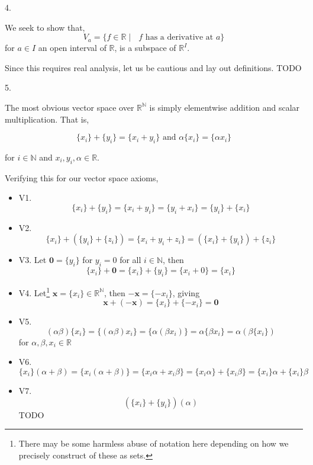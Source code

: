 \documentclass[letterpaper,11pt]{article}
\theoremstyle{definition}
\begin{document}
\pagebreak

\begin{flushleft}
	4.
\end{flushleft}

We seek to show that, $$V_a = \{f \in \mathbb{R} \mid \text{ $f$ has a derivative at $a$}\}$$ for $a \in I$ an open interval of $\mathbb{R}$, is a subspace of $\mathbb{R}^I$. 

\hrulefill

Since this requires real analysis, let us be cautious and lay out definitions. 
TODO

\begin{flushleft}
	5.
\end{flushleft}

The most obvious vector space over $\mathbb{R}^\mathbb{N}$ is simply elementwise addition and scalar multiplication. That is, 

$$\{x_i\} + \{y_i\} = \{x_i + y_i\} \text{ and } \alpha \{x_i\}= \{\alpha x_i\}$$

for $i \in \mathbb{N}$ and $x_i, y_i, \alpha \in \mathbb{R}$. 

Verifying this for our vector space axioms, 

\begin{itemize}[noitemsep]
	\item V1. $$\{x_i\} + \{y_i\} = \{x_i + y_i\} = \{y_i + x_i\} = \{y_i\} + \{x_i\}$$
	\item V2. $$\{x_i\} + \left(\{y_i\} + \{z_i\}\right) = \{x_i + y_i + z_i\} = (\{x_i\} + \{y_i\}) + \{z_i\} $$
	\item V3. Let $\textbf{0} = \{y_i\}$ for $y_i = 0$ for all $i \in \mathbb{N}$, then $$\{x_i\} + \textbf{0} = \{x_i\} + \{y_i\} = \{x_i + 0\} = \{x_i\}$$ 
	\item V4. Let\footnote{There may be some harmless abuse of notation here depending on how we precisely construct of these as sets.} $\textbf{x} = \{x_i\} \in \mathbb{R}^\mathbb{N}$, then $-\textbf{x} = \{-x_i\}$, giving $$\textbf{x} + (-\textbf{x}) = \{x_i\} + \{-x_i\} = \textbf{0}$$
	\item V5. $$(\alpha\beta) \{x_i\} = \{(\alpha \beta) x_i \} = \{\alpha (\beta x_i)\} = \alpha \{\beta x_i\} = \alpha (\beta \{x_i\})$$ for $\alpha, \beta, x_i \in \mathbb{R}$
	\item V6. $$\{x_i\}(\alpha + \beta) = \{x_i(\alpha + \beta)\} = \{x_i\alpha + x_i\beta\} = \{x_i\alpha\} + \{x_i\beta\} = \{x_i\}\alpha + \{x_i\}\beta$$
	\item V7. $$(\{x_i\} + \{y_i\})(\alpha)$$ TODO
\end{itemize}
\end{document}
